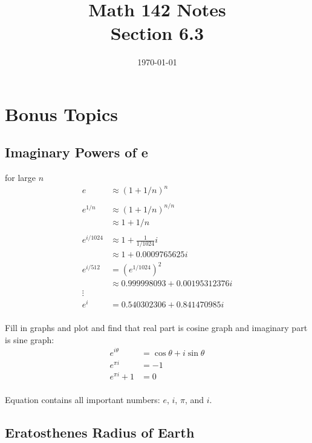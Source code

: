\documentclass{exam}
\title{Math 142 Notes \\ Section 6.3}
\date{\today}
\begin{document}
  \maketitle
  \tableofcontents

  \section{Bonus Topics}
  \subsection{Imaginary Powers of e}

  for large $n$
  \begin{align*}
    e       & \approx \left( 1 + 1/n \right)^n \\
    \\
    e^{1/n} & \approx \left( 1 + 1/n \right)^{n/n} \\
            & \approx 1 + 1/n \\
    \\
    e^{i/1024} & \approx 1 + \frac{1}{1/1024} i \\
               & \approx 1 + 0.0009765625 i \\
    e^{i/512}  & = \left( e^{1/1024} \right)^2 \\
               & \approx 0.999998093 + 0.00195312376 i \\
    \vdots \\
    e^{i} &= 0.540302306 + 0.841470985 i \\
  \end{align*}

  Fill in graphs and plot and find that real part is cosine graph and imaginary part is sine graph:
  \begin{align*}
    e^{i \theta}  & = \cos \theta + i \sin \theta \\
    e^{\pi i}     & = -1 \\
    e^{\pi i} + 1 & = 0 \\
  \end{align*}

  Equation contains all important numbers: $e$, $i$, $\pi$, and $i$.

  \subsection{Eratosthenes Radius of Earth}
\end{document}

